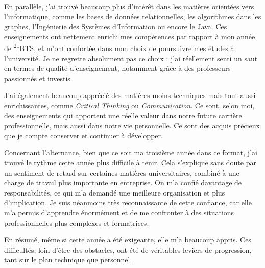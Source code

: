 En parallèle, j’ai trouvé beaucoup plus d’intérêt dans les matières orientées vers l’informatique, comme les bases de données relationnelles, les algorithmes dans les graphes, l'Ingénierie des Systèmes d’Information ou encore le Java. Ces enseignements ont nettement enrichi mes compétences par rapport à mon année de \textsuperscript{21}BTS, et m’ont confortée dans mon choix de poursuivre mes études à l’université. Je ne regrette absolument pas ce choix : j’ai réellement senti un saut en termes de qualité d’enseignement, notamment grâce à des professeurs passionnés et investis.

J’ai également beaucoup apprécié des matières moins techniques mais tout aussi enrichissantes, comme \textit{Critical Thinking} ou \textit{Communication}. Ce sont, selon moi, des enseignements qui apportent une réelle valeur dans notre future carrière professionnelle, mais aussi dans notre vie personnelle. Ce sont des acquis précieux que je compte conserver et continuer à développer.

Concernant l’alternance, bien que ce soit ma troisième année dans ce format, j’ai trouvé le rythme cette année plus difficile à tenir. Cela s’explique sans doute par un sentiment de retard sur certaines matières universitaires, combiné à une charge de travail plus importante en entreprise. On m’a confié davantage de responsabilités, ce qui m’a demandé une meilleure organisation et plus d’implication. Je suis néanmoins très reconnaissante de cette confiance, car elle m’a permis d’apprendre énormément et de me confronter à des situations professionnelles plus complexes et formatrices.

En résumé, même si cette année a été exigeante, elle m’a beaucoup appris. Ces difficultés, loin d’être des obstacles, ont été de véritables leviers de progression, tant sur le plan technique que personnel.

